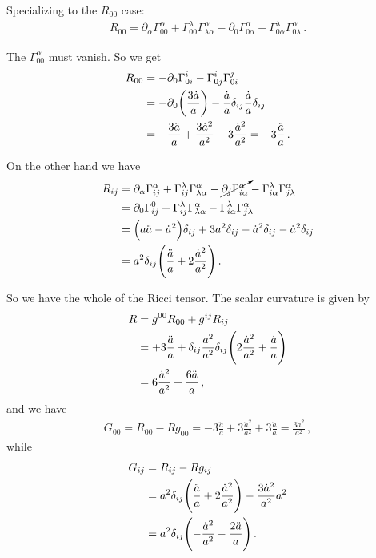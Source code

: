 \documentclass[main.tex]{subfiles}
\begin{document}
Specializing to the \(R_{00} \) case: 
\begin{align}
    R_{0 0 } = \partial_{\alpha} \Gamma^{\alpha }_{ 0 0 } + \Gamma^{\lambda }_{0 0 } \Gamma^{\alpha }_{\lambda \alpha } - \partial_{0 }\Gamma^{\alpha }_{0 \alpha } - \Gamma^{\lambda }_{0 \alpha } \Gamma^{\alpha }_{0 \lambda }
  \,.
\end{align}

The \(\Gamma^{\alpha }_{00}\) must vanish. So we get 
%
\begin{align}
  R_{00} &= - \partial_{0} \Gamma^{i}_{0i} - \Gamma^{i}_{0j} \Gamma^{j}_{0i}  \\
  &= - \partial_{0} \qty(\frac{3 \dot{a}}{a}) - \frac{\dot{a}}{a} \delta_{ij} \frac{\dot{a}}{a} \delta_{ij}  \\
  &= - \frac{3 \ddot{a}}{a} + \frac{3 \dot{a}^2}{a^2} 
  - 3 \frac{\dot{a}^2}{a^2} = - 3 \frac{\ddot{a}}{a}
\,.
\end{align}

On the other hand we have 
%
\begin{align}
R_{i j } &= \partial_{\alpha} \Gamma^{\alpha }_{ i j } + \Gamma^{\lambda }_{i j } \Gamma^{\alpha }_{\lambda \alpha } - \cancelto{}{\partial_{j }\Gamma^{\alpha }_{i \alpha }} - \Gamma^{\lambda }_{i \alpha } \Gamma^{\alpha }_{j \lambda }  \\
&= \partial_{0} \Gamma^{0 }_{ i j } 
+ \Gamma^{\lambda }_{i j } \Gamma^{\alpha }_{\lambda \alpha }
- \Gamma^{\lambda }_{i \alpha } \Gamma^{\alpha }_{j \lambda }
\\
&= \qty(a \ddot{a} - \dot{a}^2)  \delta_{ij}
+ 3 a^2 \delta_{ij} - \dot{a}^2 \delta_{ij} - \dot{a}^2 \delta_{ij}  \\
&= a^2 \delta_{ij} \qty(\frac{\ddot{a}}{a} + 2 \frac{\dot{a}^2}{a^2})
\,.
\end{align}

So we have the whole of the Ricci tensor. 
The scalar curvature is given by 
%
\begin{align}
  R &= g^{00} R_{00} + g^{ij} R_{ij}  \\
  &= + 3 \frac{\ddot{a}}{a} + \delta_{ij} \frac{a^2}{a^2} \delta_{ij}  \qty( 2 \frac{\dot{a}^2}{a^2} + \frac{\dot{a}}{a})  \\
  &= 6 \frac{\dot{a}^2}{a^2} + \frac{6 \ddot{a}}{a}
\,,
\end{align}
%
and we have 
%
\begin{align}
  G_{00 } = R_{00} - R g_{00} = - 3\frac{\ddot{a}}{a}
  + 3 \frac{\dot{a}^2}{a^2} + 3 \frac{\ddot{a}}{a} = \frac{3 \dot{a}^2}{a^2}
\,,
\end{align}
%
while 
%
\begin{align}
  G_{ij} &= R_{ij} - Rg_{ij} \\
  &= a^2 \delta_{ij} \qty(\frac{\ddot{a}}{a} + 2 \frac{\dot{a}^2}{a^2}) - \frac{3 \dot{a}^2}{a^2} a^2  \\
  &= a^2 \delta_{ij} \qty(- \frac{\dot{a}^2}{a^2} - \frac{2 \ddot{a}}{a})
\,.
\end{align}
\end{document}
